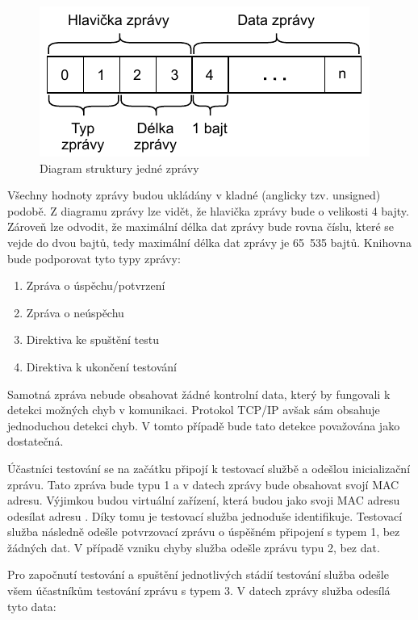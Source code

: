 \begin{figure}[htbp]
    \centering 
    \includegraphics{assets/img/message.pdf}
    \caption{Diagram struktury jedné zprávy}
    \label{fig:message}
\end{figure}

Všechny hodnoty zprávy budou ukládány v kladné (anglicky tzv. unsigned) podobě. Z diagramu zprávy lze vidět, že hlavička zprávy bude o velikosti 4 bajty. Zároveň lze odvodit, že maximální délka dat zprávy bude rovna číslu, které se vejde do dvou bajtů, tedy maximální délka dat zprávy je 65~535 bajtů. Knihovna bude podporovat tyto typy zprávy:

\begin{enumerate}
    \item Zpráva o úspěchu/potvrzení
    \item Zpráva o neúspěchu
    \item Direktiva ke spuštění testu
    \item Direktiva k ukončení testování
\end{enumerate}

Samotná zpráva nebude obsahovat žádné kontrolní data, který by fungovali k detekci možných chyb v komunikaci. Protokol TCP/IP avšak sám obsahuje jednoduchou detekci chyb. V tomto případě bude tato detekce považována jako dostatečná.

Účastníci testování se na začátku připojí k testovací službě a odešlou inicializační zprávu. Tato zpráva bude typu 1 a v datech zprávy bude obsahovat svojí MAC adresu. Výjimkou budou virtuální zařízení, která budou jako svoji MAC adresu odesílat adresu . Díky tomu je testovací služba jednoduše identifikuje. Testovací služba následně odešle potvrzovací zprávu o úspěšném připojení s typem 1, bez žádných dat. V případě vzniku chyby služba odešle zprávu typu 2, bez dat. 

Pro započnutí testování a spuštění jednotlivých stádií testování služba odešle všem účastníkům testování zprávu s typem 3. V datech zprávy služba odesílá tyto data:

